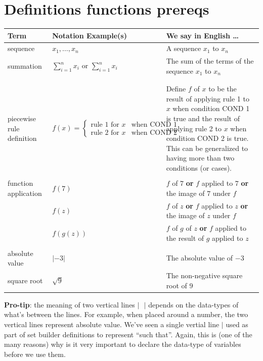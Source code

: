 \documentclass[12pt, oneside]{article}
\begin{document}
\section*{Definitions functions prereqs}


\begin{center}
\begin{tabular}{|p{1.2in}p{2.8in}p{3in}|}
\hline
{\bf Term} & {\bf Notation Example(s)} & {\bf We say in English \ldots } \\
\hline
sequence & $x_1, \ldots, x_n$ & A sequence $x_1$ to $x_n$ \\
summation & $\sum_{i=1}^n x_i$ or $\displaystyle{\sum_{i=1}^n x_i}$ & The sum of the terms of the sequence $x_1$ to $x_n$ \\
&&\\
&&\\
piecewise rule definition & $f(x) = \begin{cases} \text{rule 1 for } x & \text{when~COND 1} \\ \text{rule 2 for } x & \text{when COND 2}\end{cases}$ &
Define $f$ of $x$ to be the result of applying rule 1 to $x$ when condition COND 1 is true and the result of 
applying rule 2 to $x$ when condition COND 2 is true. This can be generalized to having more than two conditions
(or cases).\\
&&\\
function application & $f(7)$ & $f$ of $7$ {\bf or} $f$ applied to $7$ {\bf or} the image of $7$ under $f$\\
                     & $f(z)$ & $f$ of $z$ {\bf or} $f$ applied to $z$ {\bf or} the image of $z$ under $f$\\
                     & $f(g(z))$ & $f$ of $g$ of $z$ {\bf or} $f$ applied to the result of $g$ applied to $z$ \\
&&\\
absolute value & $\lvert -3 \rvert$ & The absolute value of $-3$ \\
square root & $\sqrt{9}$ & The non-negative square root of $9$ \\


\hline
\end{tabular}
\end{center}

{\bf Pro-tip}: the meaning of two vertical lines $| ~~~ |$ depends on the data-types of what's between the lines.
For example, when placed around a number, the two vertical lines represent absolute value.
We've seen a single vertial line $|$ used as part of set builder definitions to represent ``such that''.
Again, this is 
(one of the many reasons) why is it very important to declare the data-type of variables before we use them.
 \vfill
\end{document}
